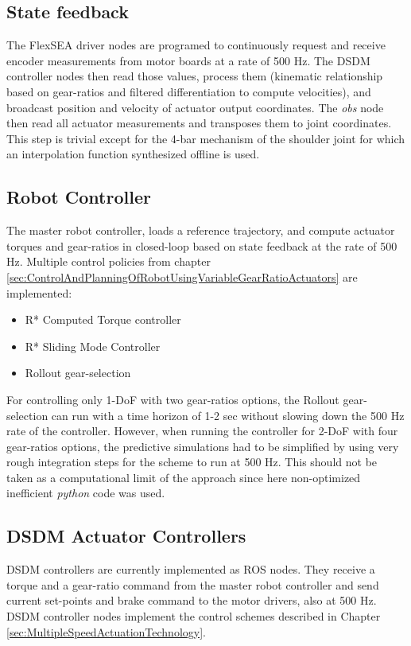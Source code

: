 \subsection{State feedback}

The FlexSEA driver nodes are programed to continuously request and receive encoder measurements from motor boards at a rate of 500 Hz. The DSDM controller nodes then read those values, process them (kinematic relationship based on gear-ratios and filtered differentiation to compute velocities), and broadcast position and velocity of actuator output coordinates. The \textit{obs} node then read all actuator measurements and transposes them to joint coordinates. This step is trivial except for the 4-bar mechanism of the shoulder joint for which an interpolation function synthesized offline is used. 

\subsection{Robot Controller}

The master robot controller, loads a reference trajectory, and compute actuator torques and gear-ratios in closed-loop based on state feedback at the rate of 500 Hz. Multiple control policies from chapter \ref{sec:ControlAndPlanningOfRobotUsingVariableGearRatioActuators} are implemented:
%
\begin{itemize}
	\item R* Computed Torque controller
	\item R* Sliding Mode Controller
	\item Rollout gear-selection
\end{itemize}
%
For controlling only 1-DoF with two gear-ratios options, the Rollout gear-selection can run with a time horizon of 1-2 sec without slowing down the 500 Hz rate of the controller. However, when running the controller for 2-DoF with four gear-ratios options, the predictive simulations had to be simplified by using very rough integration steps for the scheme to run at 500 Hz. This should not be taken as a computational limit of the approach since here non-optimized inefficient \textit{python} code was used.

\subsection{DSDM Actuator Controllers}

DSDM controllers are currently implemented as ROS nodes. They receive a torque and a gear-ratio command from the master robot controller and send current set-points and brake command to the motor drivers, also at 500 Hz. DSDM controller nodes implement the control schemes described in Chapter \ref{sec:MultipleSpeedActuationTechnology}.

